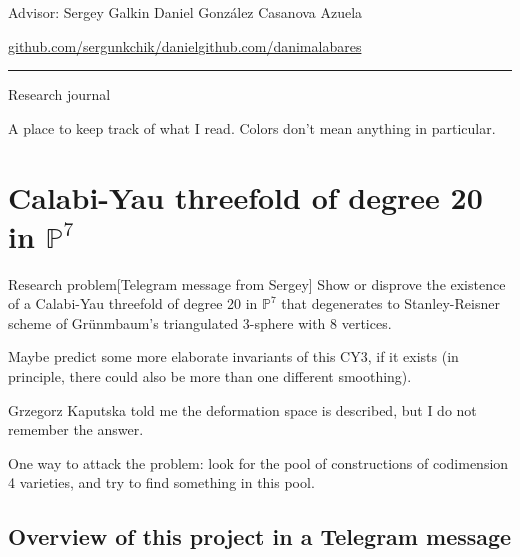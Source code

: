 
%




\begin{minipage}{\textwidth}
	\begin{minipage}{1\textwidth}
		Advisor: Sergey Galkin \hfill Daniel González Casanova Azuela
		
	{\small\href{https://github.com/sergunchik/daniel}{github.com/sergunkchik/daniel}\hfill\href{https://github.com/danimalabares}{github.com/danimalabares}}
	\end{minipage}
\end{minipage}\vspace{.2cm}\hrule

\vspace{10pt}
{\huge Research journal}

A place to keep track of what I read. Colors don't mean anything in particular.

\tableofcontents

\section{Calabi-Yau threefold of degree 20 in $\mathbb{P}^7$}

\begin{thing4}{Research problem}[Telegram message from Sergey]\leavevmode
	Show or disprove the existence of a Calabi-Yau threefold of degree 20 in $\mathbb{P}^7$ that degenerates to Stanley-Reisner scheme of Gr\"unmbaum's triangulated 3-sphere with 8 vertices.

	Maybe predict some more elaborate invariants of this CY3, if it exists (in principle, there could also be more than one different smoothing).

	Grzegorz Kaputska told me the deformation space is described, but I do not remember the answer.

One way to attack the problem: look for the pool of constructions of codimension 4 varieties, and try to find something in this pool.
\end{thing4}

\subsection{Overview of this project in a Telegram message}

